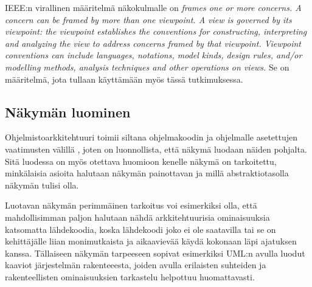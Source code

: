 \documentclass[finnish]{tktltiki2}
\numberwithin{table}{section}
\theoremstyle{definition}
\theoremstyle{remark}
\begin{document}
IEEE:n virallinen määritelmä näkokulmalle on \citep[s. 6]{ISOIEEE42010} \textit{frames one or more concerns. A concern can be framed by more than one
viewpoint.
A view is governed by its viewpoint: the viewpoint establishes the conventions for constructing, interpreting
and analyzing the view to address concerns framed by that viewpoint. Viewpoint conventions can include
languages, notations, model kinds, design rules, and/or modelling methods, analysis techniques and other
operations on views. } Se on määritelmä, jota tullaan käyttämään myös tässä tutkimuksessa.


\subsection{Näkymän luominen} %

Ohjelmistoarkkitehtuuri toimii siltana ohjelmakoodin ja ohjelmalle asetettujen vaatimusten välillä \citep[s. 94]{Garlan:2000:SAR:336512.336537}, joten on luonnollista, että näkymä luodaan näiden pohjalta. Sitä luodessa on myös otettava huomioon kenelle näkymä on tarkoitettu, minkälaisia asioita halutaan näkymän painottavan ja millä abstraktiotasolla näkymän tulisi olla. 


Luotavan näkymän perimmäinen tarkoitus voi esimerkiksi olla, että mahdollisimman paljon halutaan nähdä arkkitehtuurisia ominaisuuksia katsomatta lähdekoodia, koska lähdekoodi joko ei ole saatavilla tai se on kehittäjälle liian monimutkaista ja aikaavievää käydä kokonaan läpi ajatuksen kanssa. Tällaiseen näkymän tarpeeseen sopivat esimerkiksi UML:n avulla luodut kaaviot järjestelmän rakenteeesta, joiden avulla erilaisten suhteiden ja rakenteellisten ominaisuuksien tarkastelu helpottuu huomattavasti.
\end{document}
